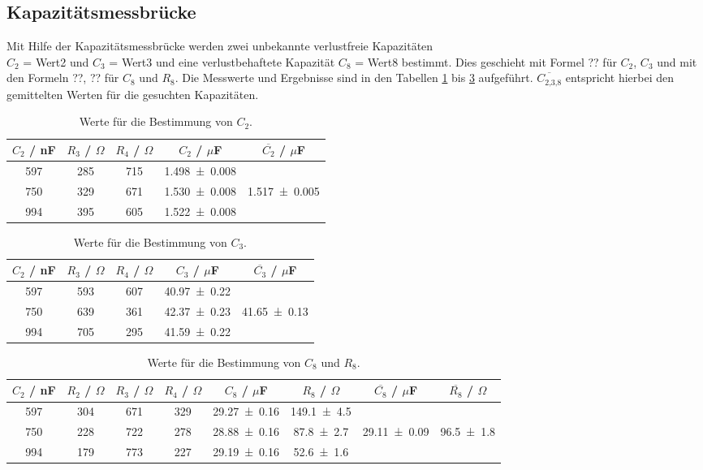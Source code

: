 \subsection{Kapazitätsmessbrücke}
Mit Hilfe der Kapazitätsmessbrücke werden zwei unbekannte verlustfreie Kapazitäten \\ $C_2$ = Wert2 und $C_3$ = Wert3 und eine verlustbehaftete Kapazität $C_8$ = Wert8 bestimmt. Dies geschieht mit Formel ?? für $C_2$, $C_3$ und mit den Formeln ??, ?? für $C_8$ und $R_8$. Die Messwerte und Ergebnisse sind in den Tabellen \ref{tab:Kapa1} bis \ref{tab:Kapa3} aufgeführt. $\overline{C_\text{2,3,8}}$ entspricht hierbei den gemittelten Werten für die gesuchten Kapazitäten.
\begin{table}[H]
  \centering
  \begin{tabular}{c c c c c}
    \toprule
    $C_2$ / nF & $R_3$ / $\Omega$ & $R_4$ / $\Omega$ & $C_2$ / $\mu$F & $\overline{C_2}$ / $\mu$F \\
    \midrule
    597 & 285 & 715 & \num{1.498 +- 0.008} &  \\
    750 & 329 & 671 & \num{1.530 +- 0.008} &  \num{1.517 +- 0.005}  \\
    994 & 395 & 605 & \num{1.522 +- 0.008} &  \\
  \end{tabular}
  \caption{Werte für die Bestimmung von $C_2$.}
  \label{tab:Kapa1}
\end{table}

\begin{table}[H]
  \centering
  \begin{tabular}{c c c c c}
    \toprule
    $C_2$ / nF & $R_3$ / $\Omega$ & $R_4$ / $\Omega$ & $C_3$ / $\mu$F & $\overline{C_3}$ / $\mu$F \\
    \midrule
    597 & 593 & 607 & \num{40.97 +- 0.22} &  \\
    750 & 639 & 361 & \num{42.37 +- 0.23} &  \num{41.65 +- 0.13}  \\
    994 & 705 & 295 & \num{41.59 +- 0.22} &  \\
  \end{tabular}
  \caption{Werte für die Bestimmung von $C_3$.}
  \label{tab:Kapa2}
\end{table}

\begin{table}[H]
  \centering
  \begin{tabular}{c c c c c c c c}
    \toprule
    $C_2$ / nF & $R_2$ / $\Omega$ & $R_3$ / $\Omega$ & $R_4$ / $\Omega$ & $C_8$ / $\mu$F & $R_8$ / $\Omega$ & $\overline{C_8}$ / $\mu$F & $\overline{R_8}$ / $\Omega$ \\
    \midrule
    597 & 304 & 671 & 329 & \num{29.27 +- 0.16} & \num{149.1 +- 4.5} & & \\
    750 & 228 & 722 & 278 & \num{28.88 +- 0.16} & \num{87.8 +- 2.7} & \num{29.11 +- 0.09} & \num{96.5 +- 1.8} \\
    994 & 179 & 773 & 227 & \num{29.19 +- 0.16} & \num{52.6 +- 1.6} & & \\
  \end{tabular}
  \caption{Werte für die Bestimmung von $C_8$ und $R_8$.}
  \label{tab:Kapa3}
\end{table}

